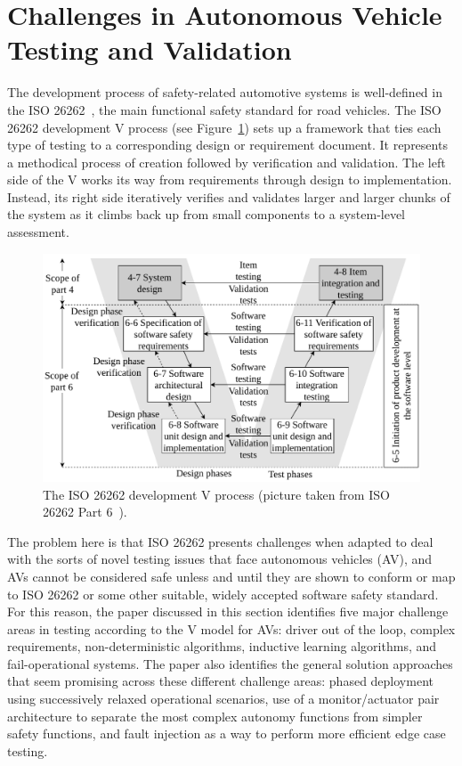 \documentclass[a4paper, 10pt]{article}
\begin{document}
\section{Challenges in Autonomous Vehicle Testing and Validation~\cite{challenges}}
The development process of safety-related automotive systems is well-defined in the ISO 26262~\cite{ISO26262}, the main functional safety standard for road vehicles. The ISO 26262 development V process (see Figure~\ref{fig:v}) sets up a framework that ties each type of testing to a corresponding design or requirement document. It represents a methodical process of creation followed by verification and validation. The left side of the V works its way from requirements through design to implementation. Instead, its right side iteratively verifies and validates larger and larger chunks of the system as it climbs back up from small components to a system-level assessment. 
\begin{figure}[htbp]
	\centering
	\includegraphics[width=0.8\linewidth]{figures/Part6development.pdf}
	\caption{The ISO 26262 development V process (picture taken from ISO 26262 Part 6~\cite{ISO26262}).}
	\label{fig:v}
\end{figure}

The problem here is that ISO 26262 presents challenges when adapted to deal with the sorts of novel testing issues that face autonomous vehicles (AV), and AVs cannot be considered safe unless and until they are shown to conform or map to ISO 26262 or some other suitable, widely accepted software safety standard. For this reason, the paper discussed in this section identifies five major challenge areas in testing according to the V model for AVs: driver out of the loop, complex requirements, non-deterministic algorithms, inductive learning algorithms, and fail-operational systems. The paper also identifies the general solution approaches that seem promising across these different challenge areas: phased deployment using successively relaxed operational scenarios, use of a monitor/actuator pair architecture to separate the most complex autonomy functions from simpler safety functions, and fault injection as a way to perform more efficient edge case testing.
\end{document}
